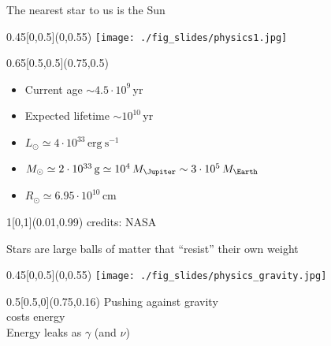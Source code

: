 \documentclass[xcolor=dvipsnames,professionalfonts, aspectratio=169]{beamer}
\begin{document}
\bgroup
{}
\begin{frame}{\textcolor{whiteish}{The nearest star to us is the Sun}}
  \begin{textblock}{0.45}[0,0.5](0,0.55)
    \texttt{[image: ./fig\_slides/physics1.jpg]}
  \end{textblock}

  \begin{textblock}{0.65}[0.5,0.5](0.75,0.5)
    \begin{itemize}
      \Large
    \item[\color{red}\textbullet] \textcolor{whiteish}{Current age $\sim 4.5\cdot 10^9$\,yr}
    \item[\color{red}\textbullet] \textcolor{whiteish}{Expected lifetime $\sim 10^{10}$\,yr}
    \item[\color{red}\textbullet]
      \textcolor{whiteish}{$L_\odot\simeq 4\cdot 10^{33}\,\mathrm{erg\ s^{-1}}$}
    \item[\color{red}\textbullet]
     \textcolor{whiteish}{$M_\odot\simeq 2\cdot 10^{33}\,\mathrm{g}\simeq 10^4\,M_\Jupiter \sim3\cdot 10^5\,M_\Earth$}

    \item[\color{red}\textbullet] \textcolor{whiteish}{$R_\odot \simeq 6.95\cdot 10^{10}$\,cm}
    \end{itemize}
  \end{textblock}


  \begin{textblock}{1}[0,1](0.01,0.99)
    \textcolor{gray!50}{\tiny credits: NASA}
  \end{textblock}
\end{frame}



\begin{frame}{\textcolor{whiteish}{Stars are large balls of matter that ``resist'' their own weight}}
    \begin{textblock}{0.45}[0,0.5](0,0.55)
      \texttt{[image: ./fig\_slides/physics\_gravity.jpg]}
    \end{textblock}

  \begin{textblock}{0.5}[0.5,0](0.75,0.16)
    \centering
    \textcolor{whiteish}{
      Pushing against gravity \\
      costs energy\\[10pt]
  Energy leaks as $\gamma$ (and $\nu$)
    }
  \end{textblock}

\end{frame}
\end{document}
